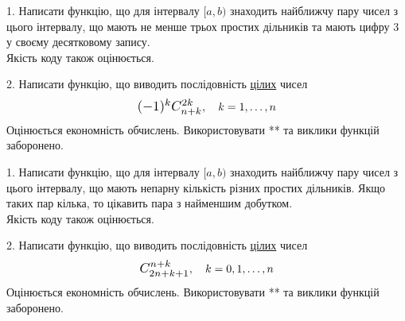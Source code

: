 \documentclass[12pt, ukrainian]{article}
\begin{document}



\begin {Large}
1. Написати функцію, що для інтервалу $[a, b)$ знаходить найближчу пару чисел з цього інтервалу, що мають не менше трьох простих дільників та мають цифру 3 у своєму десятковому запису.\\	Якість коду також оцінюється. 



\vspace{10mm}

\newpage

2. 
Написати функцію, що виводить послідовність \underline{цілих} чисел
$$\scalebox{1.2}{$(-1)^{k}C_{n+k}^{2k}$}, \quad k=1,\ldots,n$$
Оцінюється економність обчислень. Використовувати ** та виклики функцій заборонено.

\end {Large}\newpage




\begin {Large}
1. Написати функцію, що для інтервалу $[a, b)$ знаходить найближчу пару чисел з цього інтервалу, що мають непарну кількість різних простих дільників. Якщо таких пар кілька, то цікавить пара з найменшим добутком.\\	Якість коду також оцінюється. 



\vspace{10mm}

\newpage

2. 
Написати функцію, що виводить послідовність \underline{цілих} чисел
$$\scalebox{1.2}{$C_{2n+k+1}^{n+k}$}, \quad k=0,1,\ldots,n$$
Оцінюється економність обчислень. Використовувати ** та виклики функцій заборонено.

\end {Large}\newpage

\end{document}
